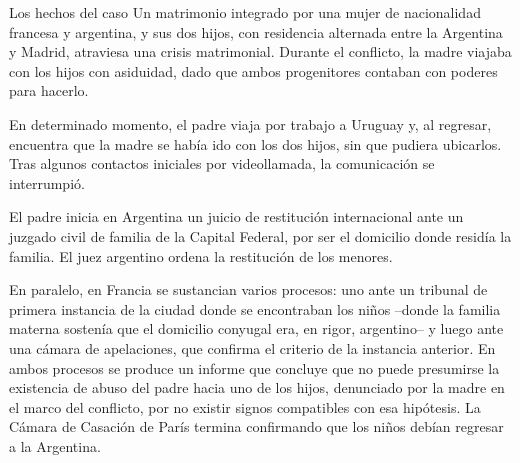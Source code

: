 \documentclass[12pt,oneside]{book}
\begin{document}
\begin{example}{Los hechos del caso}
Un matrimonio integrado por una mujer de nacionalidad francesa y argentina, y sus dos hijos, con residencia alternada entre la Argentina y Madrid, atraviesa una crisis matrimonial. Durante el conflicto, la madre viajaba con los hijos con asiduidad, dado que ambos progenitores contaban con poderes para hacerlo.

En determinado momento, el padre viaja por trabajo a Uruguay y, al regresar, encuentra que la madre se había ido con los dos hijos, sin que pudiera ubicarlos. Tras algunos contactos iniciales por videollamada, la comunicación se interrumpió.

El padre inicia en Argentina un juicio de restitución internacional ante un juzgado civil de familia de la Capital Federal, por ser el domicilio donde residía la familia. El juez argentino ordena la restitución de los menores.

En paralelo, en Francia se sustancian varios procesos: uno ante un tribunal de primera instancia de la ciudad donde se encontraban los niños --donde la familia materna sostenía que el domicilio conyugal era, en rigor, argentino-- y luego ante una cámara de apelaciones, que confirma el criterio de la instancia anterior. En ambos procesos se produce un informe que concluye que no puede presumirse la existencia de abuso del padre hacia uno de los hijos, denunciado por la madre en el marco del conflicto, por no existir signos compatibles con esa hipótesis. La Cámara de Casación de París termina confirmando que los niños debían regresar a la Argentina.
\end{example}
\end{document}
